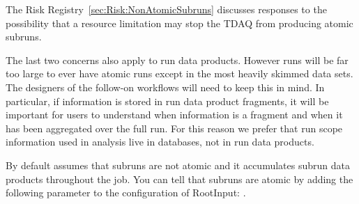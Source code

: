 The Risk Registry~\ref{sec:Risk:NonAtomicSubruns} discusses responses to the possibility
that a resource limitation may stop the TDAQ from producing atomic subruns.

The last two concerns also apply to run data products.
However runs will be far too large to ever have atomic runs except in the most heavily skimmed data sets.
The designers of the follow-on workflows will need to keep this in mind.
In particular, if information is stored in run data product fragments, it will be important for users
to understand when information is a fragment and when it has been aggregated over the full run.
For this reason we prefer that run scope information used in analysis live in databases, not in run data products.

By default \art assumes that subruns are not atomic and it accumulates subrun data products throughout the job.
You can tell \art that subruns are atomic by adding the following parameter to the configuration of
RootInput: .

